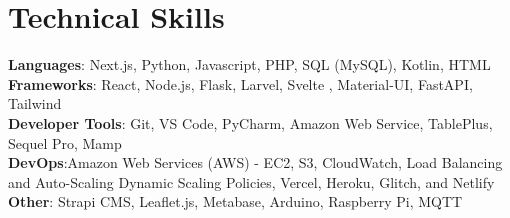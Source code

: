 \documentclass[letterpaper,11pt]{article}
\begin{document}
%
\section{Technical Skills}
 \begin{itemize}[leftmargin=0.15in, label={}]
    \small{\item{
     \textbf{Languages}{: Next.js, Python, Javascript, PHP, SQL (MySQL), Kotlin, HTML} \\
     \textbf{Frameworks}{: React, Node.js, Flask, Larvel, Svelte , Material-UI, FastAPI, Tailwind} \\
     \textbf{Developer Tools}{: Git, VS Code,  PyCharm, Amazon Web Service, TablePlus, Sequel Pro, Mamp} \\
      \textbf{DevOps}{:Amazon Web Services (AWS) - EC2, S3, CloudWatch, Load Balancing and Auto-Scaling Dynamic Scaling Policies, Vercel, Heroku, Glitch, and Netlify } \\
     \textbf{Other}{: Strapi CMS, Leaflet.js, Metabase, Arduino, Raspberry Pi, MQTT}
    }}
 \end{itemize}


\end{document}
